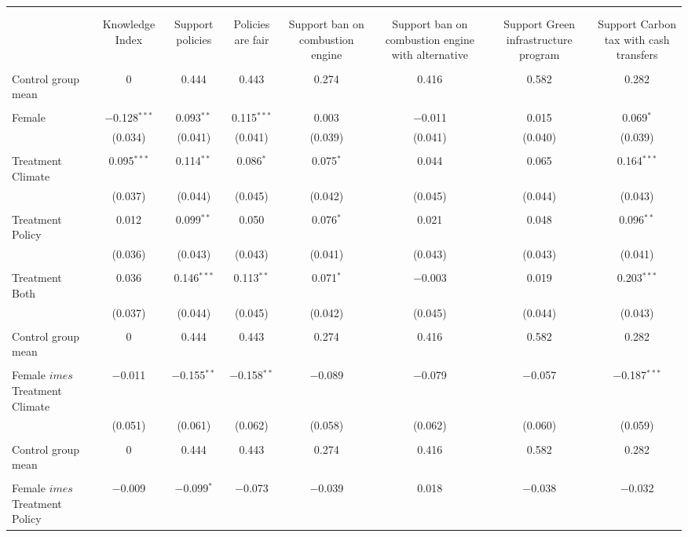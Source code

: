 
\begin{tabular}{@{\extracolsep{5pt}}lccccccc} 
\\[-1.8ex]\hline 
\hline \\[-1.8ex] 
\\[-1.8ex] & Knowledge Index & Support policies & Policies are fair & Support 
 ban on combustion engine & Support 
 ban on combustion engine with alternative & Support 
 Green infrastructure program & Support 
 Carbon tax with cash transfers \\ 
\hline \\[-1.8ex] 
 Control group mean & 0 & 0.444 & 0.443 & 0.274 & 0.416 & 0.582 & 0.282  \\ \hline \\[-1.8ex] Female & $-$0.128$^{***}$ & 0.093$^{**}$ & 0.115$^{***}$ & 0.003 & $-$0.011 & 0.015 & 0.069$^{*}$ \\ 
  & (0.034) & (0.041) & (0.041) & (0.039) & (0.041) & (0.040) & (0.039) \\ 
  & & & & & & & \\ 
 Treatment Climate & 0.095$^{***}$ & 0.114$^{**}$ & 0.086$^{*}$ & 0.075$^{*}$ & 0.044 & 0.065 & 0.164$^{***}$ \\ 
  & (0.037) & (0.044) & (0.045) & (0.042) & (0.045) & (0.044) & (0.043) \\ 
  & & & & & & & \\ 
 Treatment Policy & 0.012 & 0.099$^{**}$ & 0.050 & 0.076$^{*}$ & 0.021 & 0.048 & 0.096$^{**}$ \\ 
  & (0.036) & (0.043) & (0.043) & (0.041) & (0.043) & (0.043) & (0.041) \\ 
  & & & & & & & \\ 
 Treatment Both & 0.036 & 0.146$^{***}$ & 0.113$^{**}$ & 0.071$^{*}$ & $-$0.003 & 0.019 & 0.203$^{***}$ \\ 
  & (0.037) & (0.044) & (0.045) & (0.042) & (0.045) & (0.044) & (0.043) \\ 
  & & & & & & & \\ 
 Control group mean & 0 & 0.444 & 0.443 & 0.274 & 0.416 & 0.582 & 0.282  \\ \hline \\[-1.8ex] Female $	imes$ Treatment Climate & $-$0.011 & $-$0.155$^{**}$ & $-$0.158$^{**}$ & $-$0.089 & $-$0.079 & $-$0.057 & $-$0.187$^{***}$ \\ 
  & (0.051) & (0.061) & (0.062) & (0.058) & (0.062) & (0.060) & (0.059) \\ 
  & & & & & & & \\ 
 Control group mean & 0 & 0.444 & 0.443 & 0.274 & 0.416 & 0.582 & 0.282  \\ \hline \\[-1.8ex] Female $	imes$ Treatment Policy & $-$0.009 & $-$0.099$^{*}$ & $-$0.073 & $-$0.039 & 0.018 & $-$0.038 & $-$0.032 \\ 

\end{tabular}
